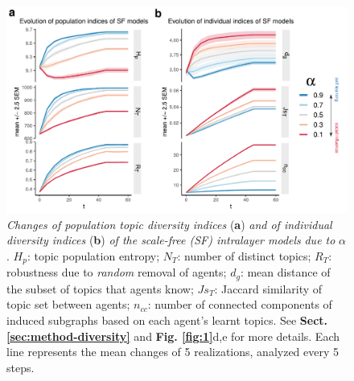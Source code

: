 \begin{figure}[!ht]
    \centering
    \includegraphics[width=\textwidth]{figures/Fig2.pdf}
    \caption{
    \textit{Changes of population topic diversity indices} (\textbf{a}) \textit{and of individual diversity indices} (\textbf{b}) \textit{of the scale-free (SF) intralayer models} \textit{due to} $\alpha$. $H_p$: topic population entropy; $N_T$: number of distinct topics; $R_T$: robustness due to \textit{random} removal of agents; $d_g$: mean distance of the subset of topics that agents know; $Js_T$: Jaccard similarity of topic set between agents; $n_{cc}$: number of connected components of induced subgraphs based on each agent's learnt topics. See \textbf{Sect. \ref{sec:method-diversity}} and \textbf{Fig. \ref{fig:1}}d,e for more details. Each line represents the mean changes of 5 realizations, analyzed every 5 steps.
    }
    \label{fig:2}
\end{figure}